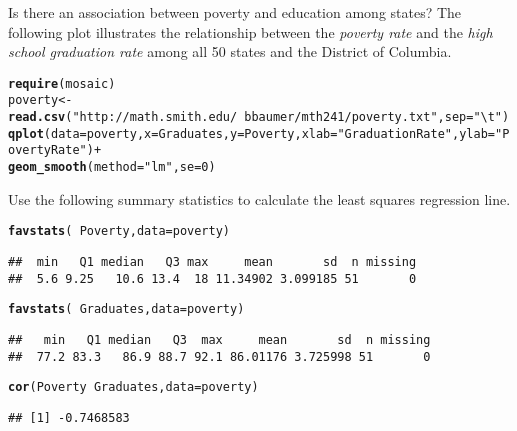\documentclass[10pt]{article}\usepackage[]{graphicx}\usepackage[]{color}
\makeatletter
\newcommand{\hlnum}[1]{\textcolor[rgb]{0.686,0.059,0.569}{#1}}%
\newcommand{\hlstr}[1]{\textcolor[rgb]{0.192,0.494,0.8}{#1}}%
\newcommand{\hlopt}[1]{\textcolor[rgb]{0,0,0}{#1}}%
\newcommand{\hlstd}[1]{\textcolor[rgb]{0.345,0.345,0.345}{#1}}%
\newcommand{\hlkwb}[1]{\textcolor[rgb]{0.69,0.353,0.396}{#1}}%
\newcommand{\hlkwc}[1]{\textcolor[rgb]{0.333,0.667,0.333}{#1}}%
\newcommand{\hlkwd}[1]{\textcolor[rgb]{0.737,0.353,0.396}{\textbf{#1}}}%
\newenvironment{kframe}{%
 \def\at@end@of@kframe{}%
 \ifinner\ifhmode%
  \def\at@end@of@kframe{\end{minipage}}%
  \begin{minipage}{\columnwidth}%
 \fi\fi%
 \def\FrameCommand##1{\hskip\@totalleftmargin \hskip-\fboxsep
 \colorbox{shadecolor}{##1}\hskip-\fboxsep
     \hskip-\linewidth \hskip-\@totalleftmargin \hskip\columnwidth}%
 \MakeFramed {\advance\hsize-\width
   \@totalleftmargin\z@ \linewidth\hsize
   \@setminipage}}%
 {\par\unskip\endMakeFramed%
 \at@end@of@kframe}
\newenvironment{knitrout}{}{} %
\makeatother
\begin{document}
Is there an association between poverty and education among states? The following plot illustrates the relationship between the \emph{poverty rate} and the \emph{high school graduation rate} among all 50 states and the District of Columbia. 

\begin{knitrout}\footnotesize
{}\color{fgcolor}\begin{kframe}
\begin{alltt}
\hlkwd{require}\hlstd{(mosaic)}
\hlstd{poverty} \hlkwb{<-} \hlkwd{read.csv}\hlstd{(}\hlstr{"http://math.smith.edu/~bbaumer/mth241/poverty.txt"}\hlstd{,} \hlkwc{sep} \hlstd{=} \hlstr{"\textbackslash{}t"}\hlstd{)}
\hlkwd{qplot}\hlstd{(}\hlkwc{data} \hlstd{= poverty,} \hlkwc{x} \hlstd{= Graduates,} \hlkwc{y} \hlstd{= Poverty,} \hlkwc{xlab} \hlstd{=} \hlstr{"Graduation Rate"}\hlstd{,} \hlkwc{ylab} \hlstd{=} \hlstr{"Poverty Rate"}\hlstd{)} \hlopt{+}
  \hlkwd{geom_smooth}\hlstd{(}\hlkwc{method} \hlstd{=} \hlstr{"lm"}\hlstd{,} \hlkwc{se} \hlstd{=} \hlnum{0}\hlstd{)}
\end{alltt}
\end{kframe}
\end{knitrout}

Use the following summary statistics to calculate the least squares regression line. 

\begin{knitrout}\footnotesize
{}\color{fgcolor}\begin{kframe}
\begin{alltt}
\hlkwd{favstats}\hlstd{(}\hlopt{~}\hlstd{Poverty,} \hlkwc{data} \hlstd{= poverty)}
\end{alltt}
\begin{verbatim}
##  min   Q1 median   Q3 max     mean       sd  n missing
##  5.6 9.25   10.6 13.4  18 11.34902 3.099185 51       0
\end{verbatim}
\begin{alltt}
\hlkwd{favstats}\hlstd{(}\hlopt{~}\hlstd{Graduates,} \hlkwc{data} \hlstd{= poverty)}
\end{alltt}
\begin{verbatim}
##   min   Q1 median   Q3  max     mean       sd  n missing
##  77.2 83.3   86.9 88.7 92.1 86.01176 3.725998 51       0
\end{verbatim}
\begin{alltt}
\hlkwd{cor}\hlstd{(Poverty} \hlopt{~} \hlstd{Graduates,} \hlkwc{data} \hlstd{= poverty)}
\end{alltt}
\begin{verbatim}
## [1] -0.7468583
\end{verbatim}
\end{kframe}
\end{knitrout}
\end{document}
